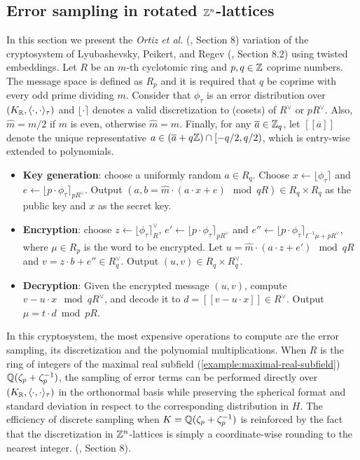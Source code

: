 \documentclass[a4paper,12pt]{article}
\begin{document}
\subsection{Error sampling in rotated \(\mathbb{Z}^n\)-lattices}
\label{sampling-in-zn-rotated-lattices}
   \begin{text}
  In this section we present the \textit{Ortiz et al.} (\cite{Ortiz2021}, Section 8)
  variation of the cryptosystem of Lyubashevsky, Peikert, and Regev
  (\cite{LPV2013}, Section 8.2) using twisted embeddings. Let $R$ be an $m$-th
  cyclotomic ring and $p, q \in \mathbb{Z}$ coprime numbers. The message space is defined as
  $R_p$ and it is required that $q$ be coprime with every odd prime dividing
  $m$. Consider that $\phi_\tau$ is an error distribution over $(K_{\mathbb{R}},\langle{\cdot,\cdot}\rangle_\tau)$
  and $\lfloor{\cdot}\rceil$ denotes a valid discretization to (cosets) of $R^\vee$ or $pR^\vee$.
  Also, $\hat{m} = m/2$ if $m$ is even, otherwise $\hat{m} = m$. Finally, for any
  $\overline{a} \in \mathbb{Z}_q$, let $[[\overline{a}]]$ denote the unique representative
  $a \in (\overline{a} + q\mathbb{Z}) \cap [-q/2, q/2)$, which is entry-wise extended to
  polynomials.

  \begin{itemize}
  \item \textbf{Key generation}: choose a uniformly random $a \in R_q$. Choose $x
    \longleftarrow \lfloor{\phi_\tau}\rceil$ and $e \longleftarrow \lfloor{p \cdot \phi_\tau}\rceil_{pR^\vee}$. Output $(a,b = \hat{m}\cdot(a \cdot x + e)
    \mod{qR} ) \in R_q \times R_q$ as the public key and $x$ as the secret key.
  \item \textbf{Encryption}: choose $z \longleftarrow  \lfloor{\phi_\tau}\rceil_R^\vee$, $e' \longleftarrow \lfloor{p \cdot
      \phi_\tau}\rceil_{pR^\vee}$ and  $e'' \longleftarrow \lfloor{p \cdot \phi_\tau}\rceil_{t^{-1}\mu +pR^\vee}$, where $\mu \in R_p$ is
    the word to be encrypted. Let $u = \hat{m} \cdot (a \cdot z + e') \mod{qR}$ and $v =
    z \cdot b + e'' \in R_q^\vee$. Output $(u,v) \in R_q \times R^\vee_q$.
  \item \textbf{Decryption}: Given the encrypted message $(u,v)$, compute $v - u
    \cdot x \mod{qR^\vee}$, and decode it to $d = [[v - u \cdot x]] \in R^\vee$. Output $\mu = t \cdot
    d \bmod{pR}$. 
  \end{itemize}

  In this cryptosystem, the most expensive operations to compute are the error sampling, its discretization and the polynomial multiplications. When $R$ is
  the ring of integers of the maximal real subfield
  (\ref{example:maximal-real-subfield}) $\mathbb{Q}(\zeta_{p} + \zeta_{p} ^{-1})$, the sampling of error terms can be performed directly over $(K_{\mathbb{R}}, \langle{\cdot,\cdot}\rangle_\tau)$ in the orthonormal basis while preserving the spherical format and standard deviation in respect to the corresponding distribution in $H$. The efficiency
of discrete sampling when $K = \mathbb{Q}(\zeta_p + \zeta_p^{-1})$ is reinforced by the fact
that the discretization in $\mathbb{Z}^n$-lattices is simply a coordinate-wise rounding to the nearest integer. (\cite{Ortiz2021}, Section 8).
\end{text}
\end{document}
